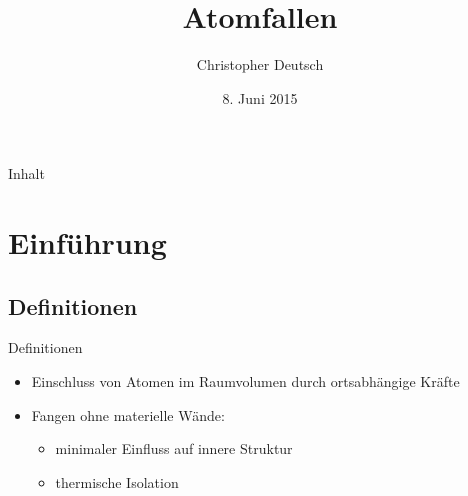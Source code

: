 \documentclass[12pt,xcolor=dvipsnames,professionalfonts]{beamer}
\author[Christopher Deutsch]
{Christopher Deutsch}
\title
{Atomfallen}
\subtitle
{}
\institute[]
{Rheinische Friedrich-Wilhelms-Universität Bonn \\
Proseminar Präsentationstechnik SS15}
\date{8. Juni 2015}
\begin{document}
\maketitle

\begin{frame}{Inhalt}
	\tableofcontents
\end{frame}


\section{Einführung}
\frame{\tableofcontents[currentsection]}

\subsection{Definitionen}
\begin{frame}{Definitionen}
	\begin{itemize}
		\setlength\itemsep{1em}
		\item Einschluss von Atomen im Raumvolumen durch ortsabhängige Kräfte
		
		\item Fangen ohne materielle Wände:
		\begin{itemize}
			\item minimaler Einfluss auf innere Struktur
			
			\item thermische Isolation
		\end{itemize}

	\end{itemize}
\end{frame}
\end{document}
